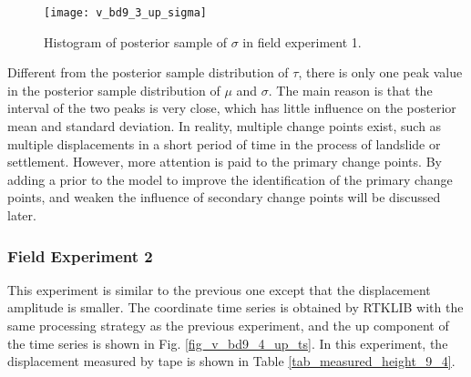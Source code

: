 \documentclass[final,3p,times]{elsarticle}
\begin{document}
	\begin{figure}[htbp]
		\centering
		\texttt{[image: v\_bd9\_3\_up\_sigma]}
		\caption{Histogram of posterior sample of $\sigma$ in field experiment 1.}
		\label{fig_v_bd9_3_up_sigma}
	\end{figure} 
	Different from the posterior sample distribution of $\tau$, there is only one peak value in the posterior sample distribution of $\mu$ and $\sigma$.
	The main reason is that the interval of the two peaks is very close, which has little influence on the posterior mean and standard deviation.
	In reality, multiple change points exist, such as multiple displacements in a short period of time in the process of landslide or settlement.
	However, more attention is paid to the primary change points.
	By adding a prior to the model to improve the identification of the primary change points, and weaken the influence of secondary change points will be discussed later.
	
	\subsubsection{Field Experiment 2}
	This experiment is similar to the previous one except that the displacement amplitude is smaller. 
	The coordinate time series is obtained by RTKLIB with the same processing strategy as the previous experiment, and the up component of the time series is shown in Fig. \ref{fig_v_bd9_4_up_ts}. 
	In this experiment, the displacement measured by tape is shown in Table \ref{tab_measured_height_9_4}.
	
\end{document}
